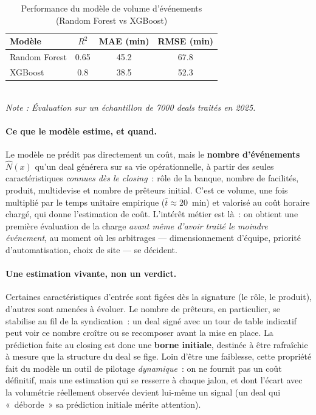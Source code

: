 \begin{table}[H]
\centering
\caption{Performance du modèle de volume d'événements (Random Forest vs XGBoost)}
\label{tab:metriques-performance}
\begin{tabular}{lccc}
\toprule
\textbf{Modèle} & \textbf{$R^2$} & \textbf{MAE (min)} & \textbf{RMSE (min)} \\
\midrule
Random Forest   & 0.65 & 45.2 & 67.8 \\
XGBoost        & 0.8 & 38.5 & 52.3 \\
\bottomrule
\end{tabular}
\small
\vspace{2mm}
\\
\textit{Note : Évaluation sur un échantillon de 7000 deals traités en 2025.}
\end{table}

\medskip
\paragraph{Ce que le modèle estime, et quand.}
Le modèle ne prédit pas directement un coût, mais le \textbf{nombre d'événements $\hat{N}(x)$} qu'un deal générera sur sa vie opérationnelle, à partir des seules caractéristiques \emph{connues dès le closing}~: rôle de la banque, nombre de facilités, produit, multidevise et nombre de prêteurs initial. C'est ce volume, une fois multiplié par le temps unitaire empirique ($\bar t \approx 20$~min) et valorisé au coût horaire chargé, qui donne l'estimation de coût. L'intérêt métier est là~: on obtient une première évaluation de la charge \emph{avant même d'avoir traité le moindre événement}, au moment où les arbitrages --- dimensionnement d'équipe, priorité d'automatisation, choix de site --- se décident.

\medskip
\paragraph{Une estimation vivante, non un verdict.}
Certaines caractéristiques d'entrée sont figées dès la signature (le rôle, le produit), d'autres sont amenées à évoluer. Le nombre de prêteurs, en particulier, se stabilise au fil de la syndication~: un deal signé avec un tour de table indicatif peut voir ce nombre croître ou se recomposer avant la mise en place. La prédiction faite au closing est donc une \textbf{borne initiale}, destinée à être rafraîchie à mesure que la structure du deal se fige. Loin d'être une faiblesse, cette propriété fait du modèle un outil de pilotage \emph{dynamique}~: on ne fournit pas un coût définitif, mais une estimation qui se resserre à chaque jalon, et dont l'écart avec la volumétrie réellement observée devient lui-même un signal (un deal qui «~déborde~» sa prédiction initiale mérite attention).

